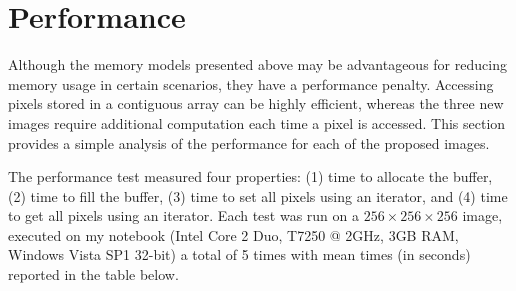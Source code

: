 \documentclass{InsightArticle}
\begin{document}
\section{Performance}
Although the memory models presented above may be advantageous for
reducing memory usage in certain scenarios,
they have a performance penalty.
Accessing pixels stored in a contiguous array can be highly efficient,
whereas the three new images require additional computation each time a pixel is accessed.
%
This section provides a simple analysis of the performance for each
of the proposed images.

The performance test measured four properties:
(1) time to allocate the buffer,
(2) time to fill the buffer,
(3) time to set all pixels using an iterator, and
(4) time to get all pixels using an iterator.
Each test was run on a $256 \times 256 \times 256$ image,
executed on my notebook (Intel Core 2 Duo, T7250 @ 2GHz, 3GB RAM, Windows Vista SP1 32-bit)
a total of 5 times with mean times (in seconds) reported in the table below.
\end{document}
